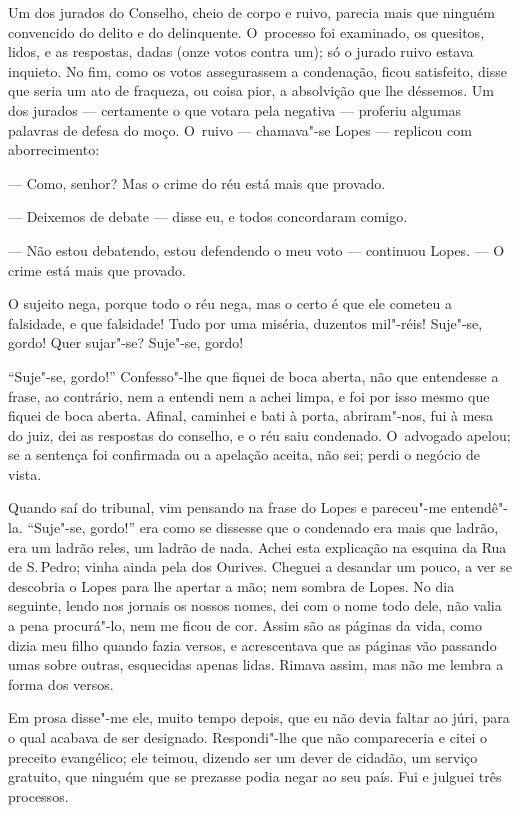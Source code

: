 \begin{linenumbers}
Um dos jurados do Conselho, cheio de corpo e ruivo, parecia mais que
ninguém convencido do delito e do delinquente. O~processo foi examinado,
os quesitos, lidos, e as respostas, dadas (onze votos contra um); só o
jurado ruivo estava inquieto. No fim, como os votos assegurassem a
condenação, ficou satisfeito, disse que seria um ato de fraqueza, ou
coisa pior, a absolvição que lhe déssemos. Um dos jurados --- certamente
o que votara pela negativa --- proferiu algumas palavras de defesa do
moço. O~ruivo --- chamava"-se Lopes --- replicou com aborrecimento:

--- Como, senhor? Mas o crime do réu está mais que provado.

--- Deixemos de debate --- disse eu, e todos concordaram comigo.

--- Não estou debatendo, estou defendendo o meu voto --- continuou Lopes.
--- O crime está mais que provado.

O sujeito nega, porque todo o réu nega, mas o certo é que ele cometeu a
falsidade, e que falsidade! Tudo por uma miséria, duzentos mil"-réis!
Suje"-se, gordo! Quer sujar"-se? Suje"-se, gordo!

``Suje"-se, gordo!'' Confesso"-lhe que fiquei de boca aberta, não que
entendesse a frase, ao contrário, nem a entendi nem a achei limpa, e foi
por isso mesmo que fiquei de boca aberta. Afinal, caminhei e bati à
porta, abriram"-nos, fui à mesa do juiz, dei as respostas do conselho, e
o réu saiu condenado. O~advogado apelou; se a sentença foi confirmada ou
a apelação aceita, não sei; perdi o negócio de vista.

Quando saí do tribunal, vim pensando na frase do Lopes e pareceu"-me
entendê"-la. ``Suje"-se, gordo!'' era como se dissesse que o condenado era
mais que ladrão, era um ladrão reles, um ladrão de nada. Achei esta
explicação na esquina da Rua de S.\,Pedro; vinha ainda pela dos Ourives.
Cheguei a desandar um pouco, a ver se descobria o Lopes para lhe apertar
a mão; nem sombra de Lopes. No dia seguinte, lendo nos jornais os nossos
nomes, dei com o nome todo dele, não valia a pena procurá"-lo, nem me
ficou de cor. Assim são as páginas da vida, como dizia meu filho quando
fazia versos, e acrescentava que as páginas vão passando umas sobre
outras, esquecidas apenas lidas. Rimava assim, mas não me lembra a forma
dos versos.

Em prosa disse"-me ele, muito tempo depois, que eu não devia faltar ao
júri, para o qual acabava de ser designado. Respondi"-lhe que não
compareceria e citei o preceito evangélico; ele teimou, dizendo ser um
dever de cidadão, um serviço gratuito, que ninguém que se prezasse podia
negar ao seu país. Fui e julguei três processos.


\end{linenumbers}
